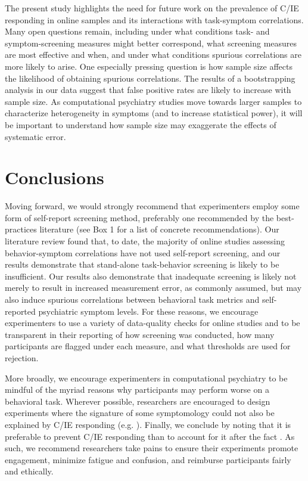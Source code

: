\documentclass[a4paper,notitlepage,12pt]{article}
\begin{document}
\begin{refsection}[main]
The present study highlights the need for future work on the prevalence of C/IE responding in online samples and its interactions with task-symptom correlations. Many open questions remain, including under what conditions task- and symptom-screening measures might better correspond, what screening measures are most effective and when, and under what conditions spurious correlations are more likely to arise. One especially pressing question is how sample size affects the likelihood of obtaining spurious correlations. The results of a bootstrapping analysis in our data suggest that false positive rates are likely to increase with sample size. As computational psychiatry studies move towards larger samples to characterize heterogeneity in symptoms (and to increase statistical power), it will be important to understand how sample size may exaggerate the effects of systematic error. 

\section{Conclusions}

Moving forward, we would strongly recommend that experimenters employ some form of self-report screening method, preferably one recommended by the best-practices literature (see Box 1 for a list of concrete recommendations). Our literature review found that, to date, the majority of online studies assessing behavior-symptom correlations have not used self-report screening, and our results demonstrate that stand-alone task-behavior screening is likely to be insufficient. Our results also demonstrate that inadequate screening is likely not merely to result in increased measurement error, as commonly assumed, but may also induce spurious correlations between behavioral task metrics and self-reported psychiatric symptom levels. For these reasons, we encourage experimenters to use a variety of data-quality checks for online studies and to be transparent in their reporting of how screening was conducted, how many participants are flagged under each measure, and what thresholds are used for rejection.

More broadly, we encourage experimenters in computational psychiatry to be mindful of the myriad reasons why participants may perform worse on a behavioral task. Wherever possible, researchers are encouraged to design experiments where the signature of some symptomology could not also be explained by C/IE responding (e.g. \cite{eldar2015interaction, hunter2019excessive}). Finally, we conclude by noting that it is preferable to prevent C/IE responding than to account for it after the fact \cite{ward2018applying}. As such, we recommend researchers take pains to ensure their experiments promote engagement, minimize fatigue and confusion, and reimburse participants fairly and ethically.


\end{refsection}
\end{document}
